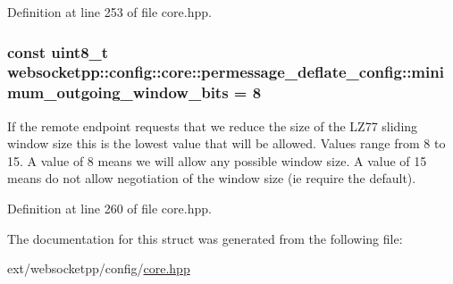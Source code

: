 Definition at line 253 of file core.\+hpp.

\hypertarget{structwebsocketpp_1_1config_1_1core_1_1permessage__deflate__config_aa43d8526e2b89349b3fd9a5372507594}{}
\subsubsection[{minimum\+\_\+outgoing\+\_\+window\+\_\+bits}]{\setlength{\rightskip}{0pt plus 5cm}const uint8\+\_\+t websocketpp\+::config\+::core\+::permessage\+\_\+deflate\+\_\+config\+::minimum\+\_\+outgoing\+\_\+window\+\_\+bits = 8\hspace{0.3cm}{\ttfamily [static]}}\label{structwebsocketpp_1_1config_1_1core_1_1permessage__deflate__config_aa43d8526e2b89349b3fd9a5372507594}
If the remote endpoint requests that we reduce the size of the L\+Z77 sliding window size this is the lowest value that will be allowed. Values range from 8 to 15. A value of 8 means we will allow any possible window size. A value of 15 means do not allow negotiation of the window size (ie require the default). 

Definition at line 260 of file core.\+hpp.



The documentation for this struct was generated from the following file\+:\begin{DoxyCompactItemize}
\item 
ext/websocketpp/config/\hyperlink{core_8hpp}{core.\+hpp}\end{DoxyCompactItemize}
